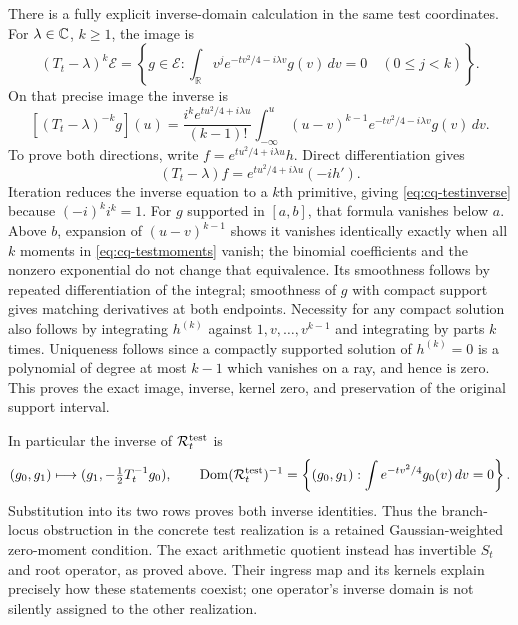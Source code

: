 There is a fully explicit inverse-domain calculation in the same
test coordinates. For $\lambda\in\mathbb C$, $k\geq1$, the image is
\begin{equation}\label{eq:cq-testmoments}
 (T_t-\lambda)^k\mathcal E
 =\left\{g\in\mathcal E:
 \int_{\mathbb R}v^j e^{-tv^2/4-i\lambda v}g(v)\,dv=0
                  \quad(0\leq j<k)\right\}.
\end{equation}
On that precise image the inverse is
\begin{equation}\label{eq:cq-testinverse}
 [(T_t-\lambda)^{-k}g](u)
 =\frac{i^ke^{tu^2/4+i\lambda u}}{(k-1)!}
 \int_{-\infty}^{u}(u-v)^{k-1}
            e^{-tv^2/4-i\lambda v}g(v)\,dv.
\end{equation}
To prove both directions, write
$f=e^{tu^2/4+i\lambda u}h$.
Direct differentiation gives
\[
 (T_t-\lambda)f=e^{tu^2/4+i\lambda u}(-i h').
\]
Iteration reduces the inverse equation to a $k$th primitive, giving
\eqref{eq:cq-testinverse} because $(-i)^ki^k=1$.
For $g$ supported in $[a,b]$, that formula vanishes below $a$.
Above $b$, expansion of $(u-v)^{k-1}$ shows it vanishes identically
exactly when all $k$ moments in \eqref{eq:cq-testmoments} vanish;
the binomial coefficients and the nonzero exponential do not change
that equivalence. Its smoothness follows by repeated differentiation
of the integral; smoothness of $g$ with compact support gives
matching derivatives at both endpoints. Necessity for any compact
solution also follows by integrating $h^{(k)}$ against
$1,v,\ldots,v^{k-1}$ and integrating by parts $k$ times.
Uniqueness follows since a compactly supported solution of
$h^{(k)}=0$ is a polynomial of degree at most $k-1$ which vanishes
on a ray, and hence is zero. This proves the exact image, inverse,
kernel zero, and preservation of the original support interval.

In particular the inverse of $\mathcal R_t^{\rm test}$ is
\[
 (g_0,g_1)\longmapsto(g_1,-\tfrac12T_t^{-1}g_0),
 \qquad
 \operatorname{Dom}(\mathcal R_t^{\rm test})^{-1}
 =\left\{(g_0,g_1):\int e^{-tv^2/4}g_0(v)\,dv=0\right\}.
\]
Substitution into its two rows proves both inverse identities.
Thus the branch-locus obstruction in the concrete test realization
is a retained Gaussian-weighted zero-moment condition. The exact
arithmetic quotient instead has invertible $S_t$ and root operator,
as proved above. Their ingress map and its kernels explain precisely
how these statements coexist; one operator's inverse domain is not
silently assigned to the other realization.

